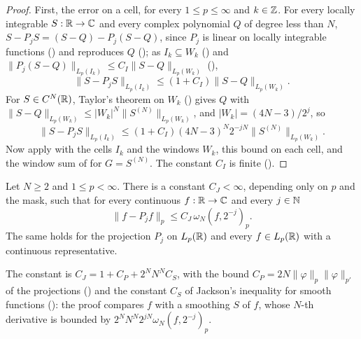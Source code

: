 \begin{proof}
\leanok
{}
First, the error on a cell, for every $1 \leq p \leq \infty$ and $k \in \mathbb{Z}$. For every locally
integrable $S : \mathbb{R} \to \mathbb{C}$ and every complex polynomial $Q$ of degree less than $N$,
$S - P_j S = (S - Q) - P_j(S - Q)$, since $P_j$ is linear on locally integrable functions
() and reproduces $Q$ (); as
$I_k \subseteq W_k$ () and
$\|P_j(S - Q)\|_{L_p(I_k)} \leq C_I \|S - Q\|_{L_p(W_k)}$ (),
\[
  \|S - P_j S\|_{L_p(I_k)} \leq (1 + C_I) \|S - Q\|_{L_p(W_k)} .
\]
For $S \in C^N(\mathbb{R})$, Taylor's theorem on $W_k$ () gives $Q$ with
$\|S - Q\|_{L_p(W_k)} \leq |W_k|^N \|S^{(N)}\|_{L_p(W_k)}$, and $|W_k| = (4N - 3)/2^j$, so
\[
  \|S - P_j S\|_{L_p(I_k)} \leq (1 + C_I) (4N - 3)^N 2^{-jN} \|S^{(N)}\|_{L_p(W_k)} .
\]
Now apply  with the cells $I_k$ and the windows $W_k$, this bound
on each cell, and the window sum of  for $G = S^{(N)}$. The
constant $C_I$ is finite ().
\end{proof}

\begin{proposition}
\label{prop:daub-jackson-continuous}
\leanok
{}
Let $N \geq 2$ and $1 \leq p < \infty$. There is a constant $C_J < \infty$, depending only on $p$
and the mask, such that for every continuous $f : \mathbb{R} \to \mathbb{C}$ and every $j \in \mathbb{N}$
\[
  \|f - P_j f\|_p \leq C_J \, \omega_N(f, 2^{-j})_p .
\]
The same holds for the projection $P_j$ on $L_p(\mathbb{R})$ and every $f \in L_p(\mathbb{R})$ with a continuous
representative.
\end{proposition}

The constant is $C_J = 1 + C_P + 2^N N^N C_S$, with the bound
$C_P = 2N \|\varphi\|_p \|\varphi\|_{p'}$ of the projections () and the
constant $C_S$ of Jackson's inequality for smooth functions ():
the proof compares $f$ with a smoothing $S$ of $f$, whose $N$-th derivative is bounded by
$2^N N^N 2^{jN} \omega_N(f, 2^{-j})_p$.

